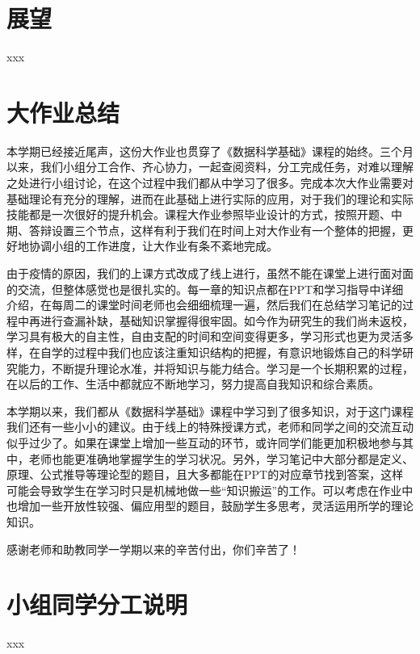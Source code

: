 \documentclass[UTF8]{ctexart}
\begin{document}
\section{展望}
xxx

\section{大作业总结}
本学期已经接近尾声，这份大作业也贯穿了《数据科学基础》课程的始终。三个月以来，我们小组分工合作、齐心协力，一起查阅资料，分工完成任务，对难以理解之处进行小组讨论，在这个过程中我们都从中学习了很多。完成本次大作业需要对基础理论有充分的理解，进而在此基础上进行实际的应用，对于我们的理论和实际技能都是一次很好的提升机会。课程大作业参照毕业设计的方式，按照开题、中期、答辩设置三个节点，这样有利于我们在时间上对大作业有一个整体的把握，更好地协调小组的工作进度，让大作业有条不紊地完成。

由于疫情的原因，我们的上课方式改成了线上进行，虽然不能在课堂上进行面对面的交流，但整体感觉也是很扎实的。每一章的知识点都在PPT和学习指导中详细介绍，在每周二的课堂时间老师也会细细梳理一遍，然后我们在总结学习笔记的过程中再进行查漏补缺，基础知识掌握得很牢固。如今作为研究生的我们尚未返校，学习具有极大的自主性，自由支配的时间和空间变得更多，学习形式也更为灵活多样，在自学的过程中我们也应该注重知识结构的把握，有意识地锻炼自己的科学研究能力，不断提升理论水准，并将知识与能力结合。学习是一个长期积累的过程，在以后的工作、生活中都就应不断地学习，努力提高自我知识和综合素质。

本学期以来，我们都从《数据科学基础》课程中学习到了很多知识，对于这门课程我们还有一些小小的建议。由于线上的特殊授课方式，老师和同学之间的交流互动似乎过少了。如果在课堂上增加一些互动的环节，或许同学们能更加积极地参与其中，老师也能更准确地掌握学生的学习状况。另外，学习笔记中大部分都是定义、原理、公式推导等理论型的题目，且大多都能在PPT的对应章节找到答案，这样可能会导致学生在学习时只是机械地做一些“知识搬运”的工作。可以考虑在作业中也增加一些开放性较强、偏应用型的题目，鼓励学生多思考，灵活运用所学的理论知识。

感谢老师和助教同学一学期以来的辛苦付出，你们辛苦了！
\section{小组同学分工说明}
xxx
\end{document}
